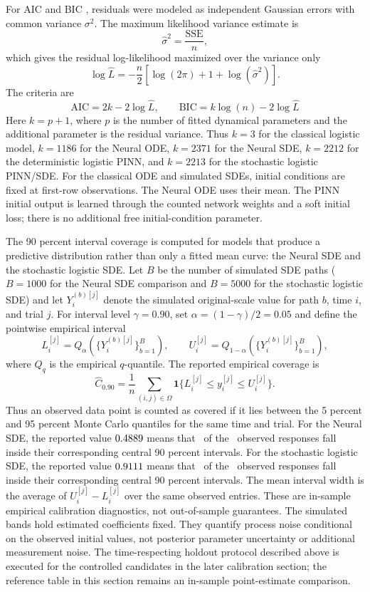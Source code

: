 For AIC and BIC \citep{akaike1974newlook,schwarz1978estimating}, residuals were
modeled as independent Gaussian errors with
common variance $\sigma^2$. The maximum likelihood variance estimate is
$$
  \widehat\sigma^2 = \frac{\mathrm{SSE}}{n},
$$
which gives the residual log-likelihood maximized over the variance only
$$
  \log \widehat L
  =
  -\frac{n}{2}
  \left[
    \log(2\pi)+1+\log(\widehat\sigma^2)
  \right].
$$
The criteria are
$$
    \mathrm{AIC}=2k-2\log\widehat L,
    \qquad
    \mathrm{BIC}=k\log(n)-2\log\widehat L
$$
Here $k=p+1$, where $p$ is the number of fitted dynamical parameters and the
additional parameter is the residual variance. Thus $k=3$ for the classical
logistic model, $k=1186$ for the Neural ODE, $k=2371$ for the Neural SDE,
$k=2212$ for the deterministic logistic PINN, and $k=2213$ for the stochastic
logistic PINN/SDE.
For the classical ODE and simulated SDEs, initial conditions are fixed at
first-row observations. The Neural ODE uses their mean. The PINN initial
output is learned through the counted network weights and a soft initial
loss; there is no additional free initial-condition parameter.

The 90 percent interval coverage is computed for models that produce a
predictive distribution rather than only a fitted mean curve: the Neural SDE
and the stochastic logistic SDE. Let $B$ be the number of simulated SDE paths
($B=1000$ for the Neural SDE comparison and $B=5000$ for the stochastic
logistic SDE) and let
$Y_i^{(b)[j]}$ denote the simulated original-scale value for path $b$, time
$i$, and trial $j$. For interval level $\gamma=0.90$, set
$\alpha=(1-\gamma)/2=0.05$ and define the pointwise empirical interval
$$
  L_i^{[j]}=Q_{\alpha}\left(\{Y_i^{(b)[j]}\}_{b=1}^B\right),
  \qquad
  U_i^{[j]}=Q_{1-\alpha}\left(\{Y_i^{(b)[j]}\}_{b=1}^B\right),
$$
where $Q_q$ is the empirical $q$-quantile. The reported empirical coverage is
$$
  \widehat C_{0.90}
  =
  \frac{1}{n}
  \sum_{(i,j)\in\Omega}
  \mathbf 1\{L_i^{[j]}\le y_i^{[j]}\le U_i^{[j]}\}.
$$
Thus an observed data point is counted as covered if it lies between the 5
percent and 95 percent Monte Carlo quantiles for the same time and trial. For
the Neural SDE, the reported value $0.4889$ means that \neuralCovered\ of the \observationCount\ observed
responses fall inside their corresponding central 90 percent intervals. For
the stochastic logistic SDE, the reported value $0.9111$ means that \logisticCovered\ of the
\observationCount\ observed responses fall inside their corresponding central 90 percent
intervals. The mean interval width is the average of $U_i^{[j]}-L_i^{[j]}$ over
the same observed entries. These are in-sample empirical calibration
diagnostics, not out-of-sample guarantees.
The simulated bands hold estimated coefficients fixed. They quantify process
noise conditional on the observed initial values, not posterior parameter
uncertainty or additional measurement noise. The time-respecting holdout
protocol described above is executed for the controlled candidates in the later
calibration section; the reference table in this section remains an
in-sample point-estimate comparison.
